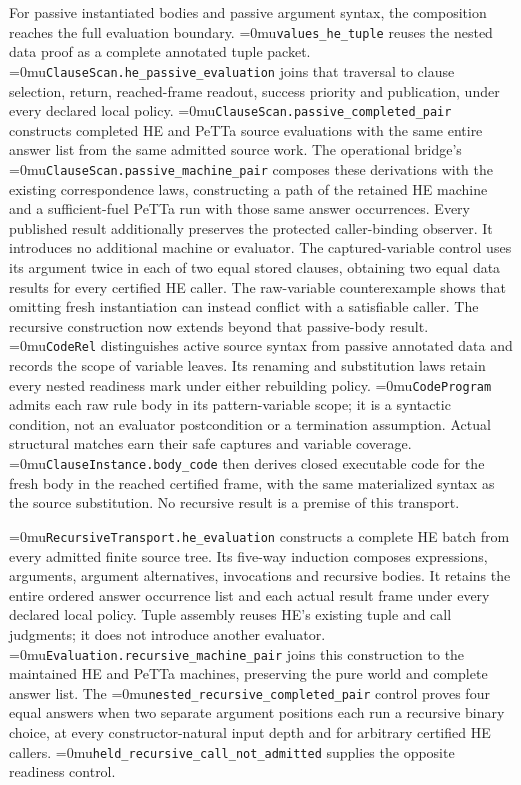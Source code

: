 \documentclass[11pt,a4paper]{article}
\newcommand{\name}[1]{\textup{\Urlmuskip=0mu\relax\nolinkurl{#1}}}
\begin{document}
For passive instantiated bodies and passive argument syntax, the composition
reaches the full evaluation boundary.
\name{values\_he\_tuple} reuses the nested data proof as a complete annotated
tuple packet. \name{ClauseScan.he\_passive\_evaluation} joins that traversal
to clause selection, return, reached-frame readout, success priority and
publication, under every declared local policy.
\name{ClauseScan.passive\_completed\_pair} constructs completed HE and PeTTa
source evaluations with the same entire answer list from the same admitted
source work. The operational bridge's \name{ClauseScan.passive\_machine\_pair}
composes these derivations with the existing correspondence laws, constructing
a path of the retained HE machine and a sufficient-fuel PeTTa run with those
same answer occurrences. Every published result additionally preserves the
protected caller-binding observer. It introduces no additional machine or evaluator.
The captured-variable control uses its argument twice in each
of two equal stored clauses, obtaining two equal data results for every
certified HE caller. The raw-variable counterexample shows that omitting
fresh instantiation can instead conflict with a satisfiable caller.
The recursive construction now extends beyond that passive-body result.
\name{CodeRel} distinguishes active source syntax from passive annotated
data and records the scope of variable leaves. Its renaming and substitution
laws retain every nested readiness mark under either rebuilding policy.
\name{CodeProgram} admits each raw rule body in its pattern-variable scope;
it is a syntactic condition, not an evaluator postcondition or a termination
assumption. Actual structural matches earn their safe captures and variable
coverage. \name{ClauseInstance.body\_code} then derives closed executable
code for the fresh body in the reached certified frame, with the same
materialized syntax as the source substitution. No recursive result is a
premise of this transport.

\name{RecursiveTransport.he\_evaluation} constructs a complete HE batch
from every admitted finite source tree. Its five-way induction composes
expressions, arguments, argument alternatives, invocations and recursive
bodies. It retains the entire ordered answer occurrence list and each actual
result frame under every declared local policy. Tuple assembly reuses HE's
existing tuple and call judgments; it does not introduce another evaluator.
\name{Evaluation.recursive\_machine\_pair} joins this construction to the
maintained HE and PeTTa machines, preserving the pure world and complete
answer list. The \name{nested\_recursive\_completed\_pair} control proves
four equal answers when two separate argument positions each run a recursive
binary choice, at every constructor-natural input depth and for arbitrary
certified HE callers. \name{held\_recursive\_call\_not\_admitted} supplies
the opposite readiness control.
\end{document}
